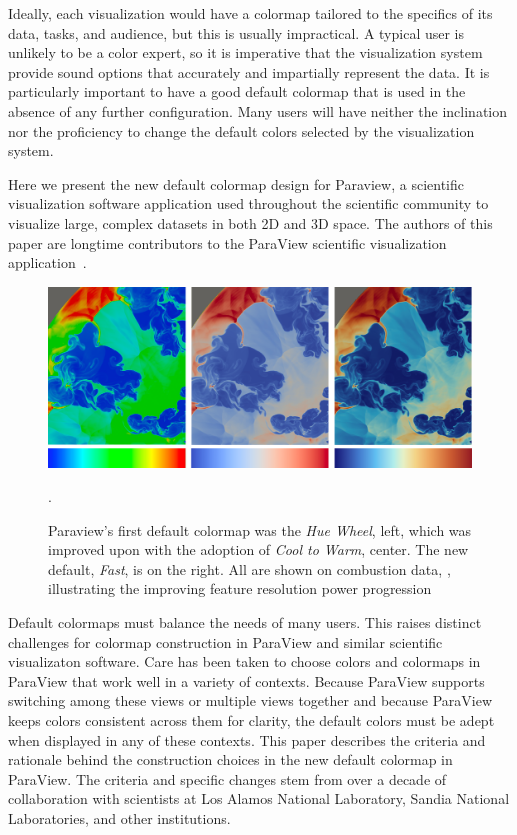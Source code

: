 \documentclass{IEEEcsmag}
\newcommand*{\colormap}[1]{\textsl{#1}\xspace}
\newcommand*{\huewheel}{\colormap{Hue Wheel}}
\newcommand*{\coolwarm}{\colormap{Cool to Warm}}
\newcommand*{\fast}{\colormap{Fast}}
\begin{document}
Ideally, each visualization would have a colormap tailored to the specifics of its data, tasks, and audience, but this is usually impractical.
A typical user is unlikely to be a color expert, so it is imperative that the visualization system provide sound options that accurately and impartially represent the data. It is particularly important to have a good default colormap that is used in the absence of any further configuration. Many users will have neither the inclination nor the proficiency to change the default colors selected by the visualization system.

Here we present the new default colormap design for Paraview, a scientific visualization software application used throughout the scientific community to visualize large, complex datasets in both 2D and 3D space. The authors of this paper are longtime contributors to the ParaView scientific visualization application~\cite{Ahrens2005}.


\begin{figure}[htb]
\centering
\includegraphics[width=\textwidth]{Larsen_the3}
\caption{Paraview's first default colormap was the \huewheel, left, which was improved upon with the adoption of \coolwarm, center. The new default, \fast, is on the right. All are shown on combustion data, \cite{Larsen}, illustrating the improving feature resolution power progression}.
\label{Larsen3}
\end{figure}

Default colormaps must balance the needs of many users. This raises distinct challenges for colormap construction in ParaView and similar scientific visualizaton software.
Care has been taken to choose colors and colormaps in ParaView that work well in a variety of contexts.
Because ParaView supports switching among these views or multiple views together and because ParaView keeps colors consistent across them for clarity, the default colors must be adept when displayed in any of these contexts.
This paper describes the criteria and rationale behind the construction choices in the new default colormap in ParaView.
The criteria and specific changes stem from over a decade of collaboration with scientists at Los Alamos National Laboratory, Sandia National Laboratories, and other institutions.
\end{document}
